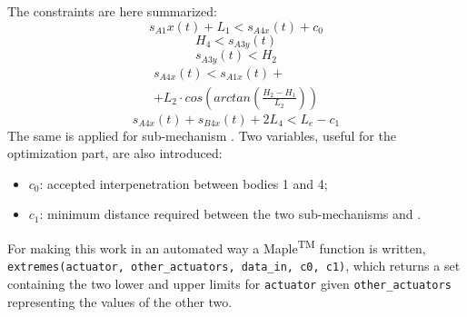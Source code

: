 \documentclass[10.5pt, twocolumn]{article}
\newcommand*\circled[1]{\tikz[baseline=(char.base)]{
	\node[shape=circle,draw,inner sep=2pt] (char) {#1};}}
\begin{document}
The constraints are here summarized:
\begin{equation}
    s_{A1}x(t)+L_1 < s_{A4x}(t)+c_0
\end{equation}
\begin{equation}
    H_4 < s_{A3y}(t)
\end{equation}
\begin{equation}
   s_{A3y}(t) < H_2
\end{equation}
\begin{multline}
    s_{A4x}(t) < s_{A1x}(t)+\\
    +L_2 \cdot cos(arctan(\frac{H_2-H_1}{L_2}))
\end{multline}
\begin{equation}
   s_{A4x}(t)+s_{B4x}(t)+2 L_4 < L_e-c_1
\end{equation}
The same is applied for sub-mechanism \circled{B}.
Two variables, useful for the optimization part, are also introduced:
\begin{itemize}
  \item \( c_0 \): accepted interpenetration between bodies 1 and 4;
  \item \( c_1 \): minimum distance required between the two sub-mechanisms \circled{A} and \circled{B}.
\end{itemize}

For making this work in an automated way a Maple\textsuperscript{TM} function is written, \texttt{extremes(actuator, other\_actuators, data\_in, c0, c1)}, which returns a set containing the two lower and upper limits for \texttt{actuator} given \texttt{other\_actuators} representing the values of the other two.
\end{document}
